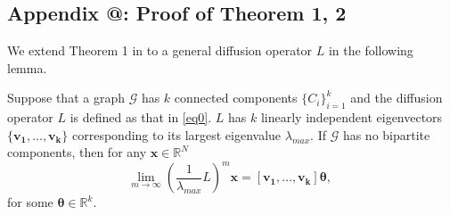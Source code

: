 \documentclass{article}
\makeatletter
\newcommand\doubleP{\mathbb{P}}
\newcommand*{\rom}[1]{\expandafter\@slowromancap\romannumeral #1@}
\newenvironment{lemma}[2][Lemma]{\begin{trivlist}
		\item[\hskip \labelsep {\bfseries #1}\hskip \labelsep {\bfseries #2.}]}{\end{trivlist}}
\newenvironment{proof}{{\noindent\it Proof}\quad}{\hfill $\square$\par}
\makeatother
\begin{document}
\subsection*{Appendix \rom{1}: Proof of Theorem 1, 2} \label{appendix:1}
We extend Theorem 1 in \cite{li2018deeper} to a general diffusion operator $L$ in the following lemma.
\begin{lemma} 1
Suppose that a graph $\mathcal{G}$ has $k$ connected components $\{C_i\}_{i=1}^k$ and the diffusion operator $L$ is defined as that in \eqref{eq0}. $L$ has $k$ linearly independent eigenvectors $\{\bm{v_1},\dots, \bm{v_k}\}$ corresponding to its largest eigenvalue $\lambda_{max}$. If $\mathcal{G}$ has no bipartite components, then for any $\bm{x} \in \mathbb{R}^N$
\begin{equation}\label{eq2}
\underset{m \rightarrow \infty }{\text{lim}}\; (\frac{1}{\lambda_{max}} L )^m \bm{x} = [\bm{v_1},\dots, \bm{v_k}] \bm{\theta},
\end{equation}
for some $\bm{\theta} \in \mathbb{R}^k$.
\end{lemma}

\end{document}
